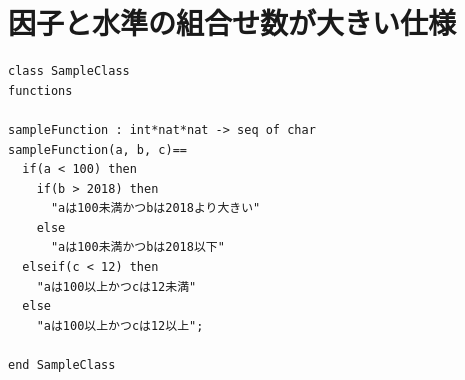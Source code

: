 \documentclass[uplatex, report, a4j, 10pt]{jsbook}
\begin{document}
\section{因子と水準の組合せ数が大きい仕様}

\lstset{language=}
\noindent\begin{minipage}{\textwidth}
  \begin{lstlisting}[caption={因子が3、水準が(6, 6, 6)の関数を持つVDM++仕様},label=fig:pict4javaSampleVdm]
class SampleClass
functions

sampleFunction : int*nat*nat -> seq of char
sampleFunction(a, b, c)==
  if(a < 100) then
    if(b > 2018) then
      "aは100未満かつbは2018より大きい"
    else
      "aは100未満かつbは2018以下"
  elseif(c < 12) then
    "aは100以上かつcは12未満"
  else
    "aは100以上かつcは12以上";

end SampleClass
\end{lstlisting}
\end{minipage}
\end{document}
